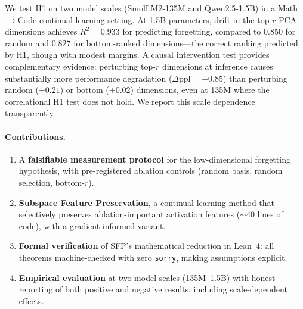 We test H1 on two model scales (SmolLM2-135M and Qwen2.5-1.5B) in a Math$\to$Code continual learning setting.
At 1.5B parameters, drift in the top-$r$ PCA dimensions achieves $R^2 = 0.933$ for predicting forgetting, compared to $0.850$ for random and $0.827$ for bottom-ranked dimensions---the correct ranking predicted by H1, though with modest margins.
A causal intervention test provides complementary evidence: perturbing top-$r$ dimensions at inference causes substantially more performance degradation ($\Delta\text{ppl} = +0.85$) than perturbing random ($+0.21$) or bottom ($+0.02$) dimensions, even at 135M where the correlational H1 test does not hold.
We report this scale dependence transparently.

\paragraph{Contributions.}
\begin{enumerate}
    \item A \textbf{falsifiable measurement protocol} for the low-dimensional forgetting hypothesis, with pre-registered ablation controls (random basis, random selection, bottom-$r$).
    \item \textbf{Subspace Feature Preservation}, a continual learning method that selectively preserves ablation-important activation features ($\sim$40 lines of code), with a gradient-informed variant.
    \item \textbf{Formal verification} of SFP's mathematical reduction in Lean~4: all theorems machine-checked with zero \texttt{sorry}, making assumptions explicit.
    \item \textbf{Empirical evaluation} at two model scales (135M--1.5B) with honest reporting of both positive and negative results, including scale-dependent effects.
\end{enumerate}
